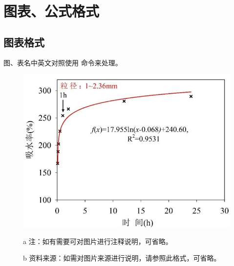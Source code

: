 
\chapter{图表、公式格式}

\section{图表格式}

图、表名中英文对照使用  命令来处理。

\begin{figure}
	\centering
	\includegraphics[]{figures/Figure 3-1.jpg}
	\label{Fig3-1}
	\begin{tablenotes}
		\item [a] 注：如有需要可对图片进行注释说明，可省略。
		\item [b] 资料来源：如需对图片来源进行说明，请参照此格式，可省略。 
	\end{tablenotes}
\end{figure}

